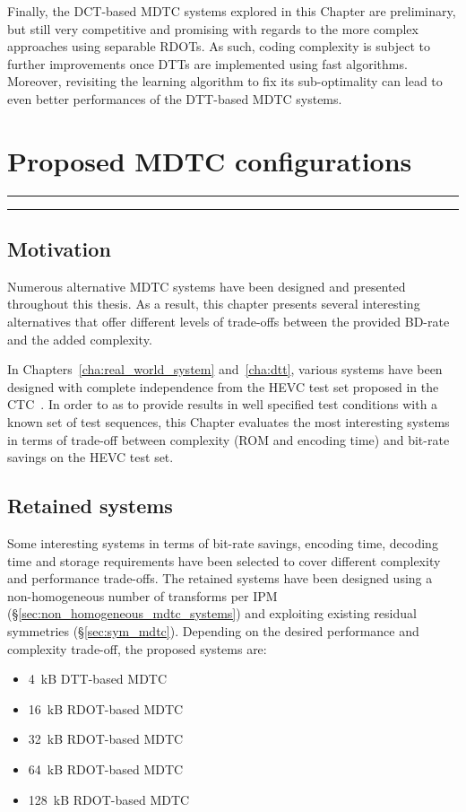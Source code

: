 \documentclass[11pt,a4paper,openright,twoside]{book}
\providecommand{\chaptertoc}{
	\startcontents[chapters]
	\hrule
	\vspace{1em}
	\printcontents[chapters]{}{1}{{\sf\large\bfseries Contents}}
	\vspace{1em}
	\hrule
}
\numberwithin{equation}{section} %
\numberwithin{figure}{section} %
\numberwithin{table}{section} %
\begin{document}
Finally, the \ac{DCT}-based \ac{MDTC} systems explored in this Chapter are
preliminary, but still very competitive and promising with regards to the more
complex approaches using separable \acp{RDOT}.
As such, coding complexity is subject to further improvements once \acp{DTT}
are implemented using fast algorithms.
Moreover, revisiting the learning algorithm to fix its sub-optimality can lead
to even better performances of the \ac{DTT}-based \ac{MDTC} systems.

\chapter{Proposed \acs{MDTC} configurations}
\label{cha:proposed_mdtc_configurations}
\chaptertoc

\section{Motivation}
\label{sec:summary_motivation}

Numerous alternative \acs{MDTC} systems have been designed and presented
throughout this thesis.
As a result, this chapter presents several interesting alternatives that offer
different levels of trade-offs between the provided \acs{BD}-rate and the
added complexity.

In Chapters~\ref{cha:real_world_system} and~\ref{cha:dtt}, various systems
have been designed with complete independence from the \ac{HEVC} test set
proposed in the \ac{CTC}~\cite{bossen-12-common-test-conditions}.
In order to as to provide results in well specified test conditions with a
known set of test sequences, this Chapter evaluates the most interesting
systems in terms of trade-off between complexity (\acs{ROM} and encoding time)
and bit-rate savings on the \ac{HEVC} test set.

\section{Retained systems}
\label{sec:retained_systems}

Some interesting systems in terms of bit-rate savings, encoding time, decoding
time and storage requirements have been selected to cover different complexity
and performance trade-offs.
The retained systems have been designed using a non-homogeneous number of
transforms per \ac{IPM} (\S\ref{sec:non_homogeneous_mdtc_systems}) and
exploiting existing residual symmetries (\S\ref{sec:sym_mdtc}).
Depending on the desired performance and complexity trade-off, the proposed
systems are:
\begin{itemize}
	\item \SI{4}{\kilo B} \acs{DTT}-based \acs{MDTC}
	\item \SI{16}{\kilo B} \acs{RDOT}-based \acs{MDTC}
	\item \SI{32}{\kilo B} \acs{RDOT}-based \acs{MDTC}
	\item \SI{64}{\kilo B} \acs{RDOT}-based \acs{MDTC}
	\item \SI{128}{\kilo B} \acs{RDOT}-based \acs{MDTC}
\end{itemize}
\end{document}
